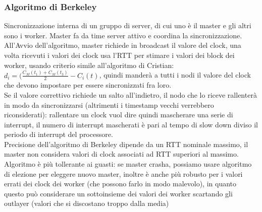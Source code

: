 \documentclass{article}
\begin{document}
\subsubsection{Algoritmo di Berkeley}
Sincronizzazione interna di un gruppo di server, di cui uno è il master e gli altri sono i worker. Master fa da time server attivo e coordina la sincronizzazione. All'Avvio dell'algoritmo, master richiede in broadcast il valore del clock, una volta ricevuti i valori dei clock usa l'RTT per stimare i valori dei block dei worker, usando criterio simile all'algoritmo di Cristian: $d_i = (\frac{C_M(t_1) + C_M(t_3)}{2} - C_i(t)$, quindi manderà a tutti i nodi il valore del clock che devono impostare per essere sincronizzati fra loro.\\ Se il valore correttivo richiede un salto all'indietro, il nodo che lo riceve rallenterà in modo da sincronizzarsi (altrimenti i timestamp vecchi verrebbero riconsiderati): rallentare un clock vuol dire quindi mascherare una serie di interrupt, il numero di interrupt mascherati è pari al tempo di slow down diviso il periodo di interrupt del processore.\\ Precisione dell'algoritmo di Berkeley dipende da un RTT nominale massimo, il master non considera valori di clock associati ad RTT superiori al massimo.\\ Algoritmo è più tollerante ai guasti: se master crasha, possiamo usare algoritmo di elezione per eleggere nuovo master, inoltre è anche più robusto per i valori errati dei clock dei worker (che possono farlo in modo malevolo), in quanto questo può considerare un sottoinsieme dei valori dei worker scartando gli outlayer (valori che si discostano troppo dalla media)
\end{document}
